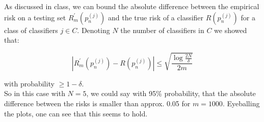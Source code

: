 \documentclass[a4paper, 11pt]{article} %
\begin{document}
As discussed in class, we can bound the absolute difference between the empirical risk on a testing set $R _ { m } ^ { \prime } \left( p _ { n } ^ { ( j ) } \right)$ and the true risk of a classifier $R \left( p _ { n } ^ { ( j ) } \right)$ for a class of classifiers $j \in C$. Denoting $N$ the number of classifiers in $C$ we showed that:

$$\left| R _ { m } ^ { \prime } \left( p _ { n } ^ { ( j ) } \right) - R \left( p _ { n } ^ { ( j ) } \right) \right| \leqslant \sqrt { \frac { \log \frac { 2 N } { \delta } } { 2 m } }$$

with probability $\geq 1 - \delta$.\\

So in this case with $N=5$, we could say with 95\% probability, that the absolute difference between the risks is smaller than approx. 0.05 for $m=1000$. Eyeballing the plots, one can see that this seems to hold. 
\end{document}

